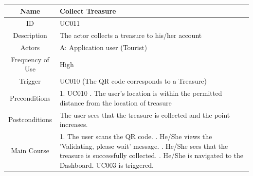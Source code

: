 \documentclass[12pt, a4paper, oneside]{article}
\begin{document}
\begin{table}[H]
\begin{tabularx}{\linewidth}{|c|X|}
\hline
Name                & Collect Treasure                                                                                                                                                                                                                     \\ \hline
ID                  & UC011                                                                                                                                                                                                                       \\ \hline
Description         & The actor collects a treasure to his/her account                                                                                                                                                   \\ \hline
Actors              & A: Application user (Tourist)                                                                                                                                                                                                 \\ \hline
Frequency of Use    & High                                                                                                                                                                                                                    \\ \hline
Trigger             & UC010 (The QR code corresponds to a Treasure)                                                                                                                                                                                           \\ \hline
Preconditions       & 1. UC010  \newline 2. The user's location is within the permitted distance from the location of treasure                                                                                                                                                                                                                        \\ \hline
Postconditions      & The user sees that the treasure is collected and the point increases.                                                                                                                                       \\ \hline
Main Course         & 1. The user scans the QR code. \newline 2. He/She views the 'Validating, please wait' message. \newline 3. He/She sees that the treasure is successfully collected. \newline 4. He/She is navigated to the Dashboard. \newline UC003 is triggered. \\ \hline

\end{tabularx}
\end{table}
\end{document}
